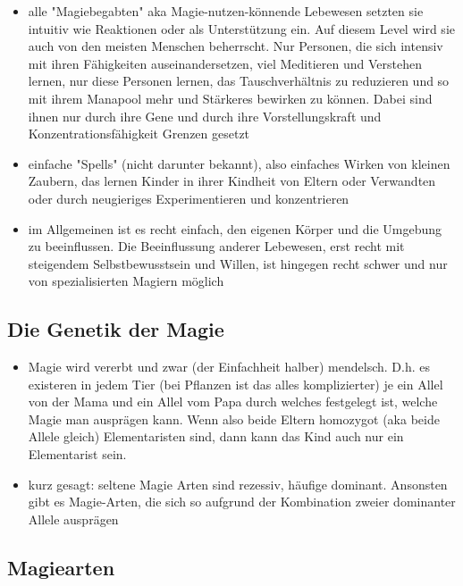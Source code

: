 \begin{itemize}
	\item alle "Magiebegabten" aka Magie-nutzen-könnende Lebewesen setzten sie intuitiv wie Reaktionen oder als Unterstützung ein. Auf diesem Level wird sie auch von den meisten Menschen beherrscht. Nur Personen, die sich intensiv mit ihren Fähigkeiten auseinandersetzen, viel Meditieren und Verstehen lernen, nur diese Personen lernen, das Tauschverhältnis zu reduzieren und so mit ihrem Manapool mehr und Stärkeres bewirken zu können. Dabei sind ihnen nur durch ihre Gene und durch ihre Vorstellungskraft und Konzentrationsfähigkeit Grenzen gesetzt
	\item einfache "Spells" (nicht darunter bekannt), also einfaches Wirken  von kleinen Zaubern, das lernen Kinder in ihrer Kindheit von Eltern oder Verwandten oder durch neugieriges Experimentieren und konzentrieren
	\item im Allgemeinen ist es recht einfach, den eigenen Körper und die Umgebung zu beeinflussen. Die Beeinflussung anderer Lebewesen, erst recht mit steigendem Selbstbewusstsein und Willen, ist hingegen recht schwer und nur von spezialisierten Magiern möglich
\end{itemize}


\subsection{Die Genetik der Magie}
\begin{itemize}
	\item Magie wird vererbt und zwar (der Einfachheit halber) mendelsch. D.h. es existeren in jedem Tier (bei Pflanzen ist das alles komplizierter) je ein Allel von der Mama und ein Allel vom Papa durch welches festgelegt ist, welche Magie man ausprägen kann. Wenn also beide Eltern homozygot (aka beide Allele gleich) Elementaristen sind, dann kann das Kind auch nur ein Elementarist sein.
	\item kurz gesagt: seltene Magie Arten sind rezessiv, häufige dominant. Ansonsten gibt es Magie-Arten, die sich so aufgrund der Kombination zweier dominanter Allele ausprägen
\end{itemize}

\subsection{Magiearten}
